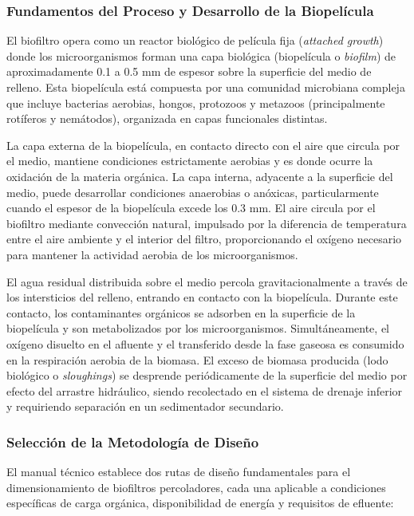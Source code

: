 \documentclass[12pt,a4paper]{article}
\begin{document}
\subsubsection*{Fundamentos del Proceso y Desarrollo de la Biopelícula}

El biofiltro opera como un reactor biológico de película fija (\textit{attached growth}) donde los microorganismos forman una capa biológica (biopelícula o \textit{biofilm}) de aproximadamente 0.1 a 0.5 mm de espesor sobre la superficie del medio de relleno. Esta biopelícula está compuesta por una comunidad microbiana compleja que incluye bacterias aerobias, hongos, protozoos y metazoos (principalmente rotíferos y nemátodos), organizada en capas funcionales distintas.

La capa externa de la biopelícula, en contacto directo con el aire que circula por el medio, mantiene condiciones estrictamente aerobias y es donde ocurre la oxidación de la materia orgánica. La capa interna, adyacente a la superficie del medio, puede desarrollar condiciones anaerobias o anóxicas, particularmente cuando el espesor de la biopelícula excede los 0.3 mm. El aire circula por el biofiltro mediante convección natural, impulsado por la diferencia de temperatura entre el aire ambiente y el interior del filtro, proporcionando el oxígeno necesario para mantener la actividad aerobia de los microorganismos.

El agua residual distribuida sobre el medio percola gravitacionalmente a través de los intersticios del relleno, entrando en contacto con la biopelícula. Durante este contacto, los contaminantes orgánicos se adsorben en la superficie de la biopelícula y son metabolizados por los microorganismos. Simultáneamente, el oxígeno disuelto en el afluente y el transferido desde la fase gaseosa es consumido en la respiración aerobia de la biomasa. El exceso de biomasa producida (lodo biológico o \textit{sloughings}) se desprende periódicamente de la superficie del medio por efecto del arrastre hidráulico, siendo recolectado en el sistema de drenaje inferior y requiriendo separación en un sedimentador secundario.

\subsubsection*{Selección de la Metodología de Diseño}

El manual técnico establece dos rutas de diseño fundamentales para el dimensionamiento de biofiltros percoladores, cada una aplicable a condiciones específicas de carga orgánica, disponibilidad de energía y requisitos de efluente:
\end{document}
